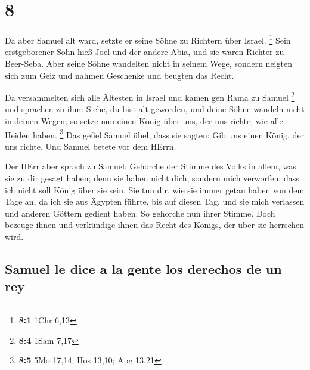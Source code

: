 \hypertarget{section-7}{%
\section{8}\label{section-7}}

 Da aber Samuel alt ward, setzte er seine Söhne zu
Richtern über Israel. \footnote{\textbf{8:1} 1Chr 6,13} 
Sein erstgeborener Sohn hieß Joel und der andere Abia, und sie waren
Richter zu Beer-Seba.  Aber seine Söhne wandelten nicht in
seinem Wege, sondern neigten sich zum Geiz und nahmen Geschenke und
beugten das Recht.

 Da versammelten sich alle Ältesten in Israel und kamen
gen Rama zu Samuel \footnote{\textbf{8:4} 1Sam 7,17}  und
sprachen zu ihm: Siehe, du bist alt geworden, und deine Söhne wandeln
nicht in deinen Wegen; so setze nun einen König über uns, der uns
richte, wie alle Heiden haben. \footnote{\textbf{8:5} 5Mo 17,14; Hos
  13,10; Apg 13,21}  Das gefiel Samuel übel, dass sie
sagten: Gib uns einen König, der uns richte. Und Samuel betete vor dem
HErrn.

 Der HErr aber sprach zu Samuel: Gehorche der Stimme des
Volks in allem, was sie zu dir gesagt haben; denn sie haben nicht dich,
sondern mich verworfen, dass ich nicht soll König über sie sein.
 Sie tun dir, wie sie immer getan haben von dem Tage an,
da ich sie aus Ägypten führte, bis auf diesen Tag, und sie mich
verlassen und anderen Göttern gedient haben.  So gehorche
nun ihrer Stimme. Doch bezeuge ihnen und verkündige ihnen das Recht des
Königs, der über sie herrschen wird.

\hypertarget{samuel-le-dice-a-la-gente-los-derechos-de-un-rey}{%
\subsection{Samuel le dice a la gente los derechos de un
rey}\label{samuel-le-dice-a-la-gente-los-derechos-de-un-rey}}

